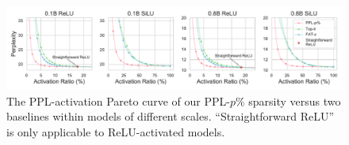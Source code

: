 \documentclass{article} %
\begin{document}


\begin{figure}[t]
    \centering
    \includegraphics[width=\linewidth]{figures/metric.pdf}
    \caption{The PPL-activation Pareto curve of our PPL-$p\%$ sparsity versus two baselines within models of different scales. ``Straightforward ReLU'' is only applicable to ReLU-activated models.}
    \label{fig:metric-pareto}
    \vspace{-1em}
\end{figure}
\end{document}

